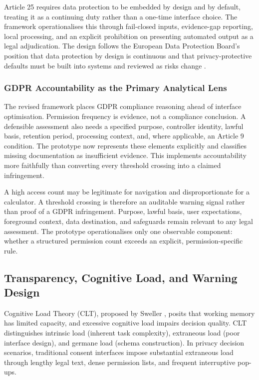 Article 25 requires data protection to be embedded by design and by default, treating it as a continuing duty rather than a one-time interface choice. The framework operationalises this through fail-closed inputs, evidence-gap reporting, local processing, and an explicit prohibition on presenting automated output as a legal adjudication. The design follows the European Data Protection Board's position that data protection by design is continuous and that privacy-protective defaults must be built into systems and reviewed as risks change \cite{edpb2019}.

\subsubsection{GDPR Accountability as the Primary Analytical Lens}

The revised framework places GDPR compliance reasoning ahead of interface optimisation. Permission frequency is evidence, not a compliance conclusion. A defensible assessment also needs a specified purpose, controller identity, lawful basis, retention period, processing context, and, where applicable, an Article 9 condition. The prototype now represents these elements explicitly and classifies missing documentation as insufficient evidence. This implements accountability more faithfully than converting every threshold crossing into a claimed infringement.

A high access count may be legitimate for navigation and disproportionate for a calculator. A threshold crossing is therefore an auditable warning signal rather than proof of a GDPR infringement. Purpose, lawful basis, user expectations, foreground context, data destination, and safeguards remain relevant to any legal assessment. The prototype operationalises only one observable component: whether a structured permission count exceeds an explicit, permission-specific rule.

\subsection{Transparency, Cognitive Load, and Warning Design}

Cognitive Load Theory (CLT), proposed by Sweller \cite{27}, posits that working memory has limited capacity, and excessive cognitive load impairs decision quality. CLT distinguishes intrinsic load (inherent task complexity), extraneous load (poor interface design), and germane load (schema construction). In privacy decision scenarios, traditional consent interfaces impose substantial extraneous load through lengthy legal text, dense permission lists, and frequent interruptive pop-ups.

